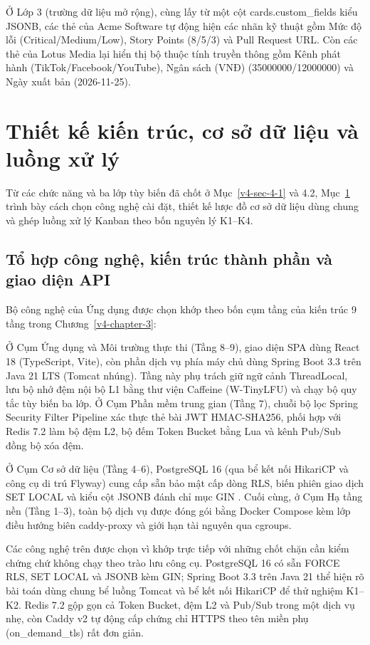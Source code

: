 Ở Lớp 3 (trường dữ liệu mở rộng), cùng lấy từ một cột cards.custom\_\allowbreak{}fields kiểu JSONB, các thẻ của Acme Software tự động hiện các nhãn kỹ thuật gồm Mức độ lỗi (Critical/Medium/Low), Story Points (8/5/3) và Pull Request URL. Còn các thẻ của Lotus Media lại hiển thị bộ thuộc tính truyền thông gồm Kênh phát hành (TikTok/Facebook/YouTube), Ngân sách (VNĐ) (35000000/12000000) và Ngày xuất bản (2026-11-25).

\section{Thiết kế kiến trúc, cơ sở dữ liệu và luồng xử lý}\label{v4-sec-4-3}

Từ các chức năng và ba lớp tùy biến đã chốt ở Mục~\ref{v4-sec-4-1} và 4.2, Mục~\ref{v4-sec-4-3} trình bày cách chọn công nghệ cài đặt, thiết kế lược đồ cơ sở dữ liệu dùng chung và ghép luồng xử lý Kanban theo bốn nguyên lý K1--K4.

\subsection{Tổ hợp công nghệ, kiến trúc thành phần và giao diện API}\label{v4-sec-4-3-1}

Bộ công nghệ của Ứng dụng được chọn khớp theo bốn cụm tầng của kiến trúc 9 tầng trong Chương~\ref{v4-chapter-3}:

Ở Cụm Ứng dụng và Môi trường thực thi (Tầng 8--9), giao diện SPA dùng React 18 (TypeScript, Vite), còn phần dịch vụ phía máy chủ dùng Spring Boot 3.3 trên Java 21 LTS (Tomcat nhúng). Tầng này phụ trách giữ ngữ cảnh ThreadLocal, lưu bộ nhớ đệm nội bộ L1 bằng thư viện Caffeine (W-TinyLFU) và chạy bộ quy tắc tùy biến ba lớp. Ở Cụm Phần mềm trung gian (Tầng 7), chuỗi bộ lọc Spring Security Filter Pipeline xác thực thẻ bài JWT HMAC-SHA256, phối hợp với Redis 7.2 làm bộ đệm L2, bộ đếm Token Bucket bằng Lua và kênh Pub/Sub đồng bộ xóa đệm.

Ở Cụm Cơ sở dữ liệu (Tầng 4--6), PostgreSQL 16 (qua bể kết nối HikariCP và công cụ di trú Flyway) cung cấp sẵn bảo mật cấp dòng RLS, biến phiên giao dịch SET LOCAL và kiểu cột JSONB đánh chỉ mục GIN \cite{v4-22}. Cuối cùng, ở Cụm Hạ tầng nền (Tầng 1--3), toàn bộ dịch vụ được đóng gói bằng Docker Compose kèm lớp điều hướng biên caddy-proxy và giới hạn tài nguyên qua cgroups.

Các công nghệ trên được chọn vì khớp trực tiếp với những chốt chặn cần kiểm chứng chứ không chạy theo trào lưu công cụ. PostgreSQL 16 có sẵn FORCE RLS, SET LOCAL và JSONB kèm GIN; Spring Boot 3.3 trên Java 21 thể hiện rõ bài toán dùng chung bể luồng Tomcat và bể kết nối HikariCP để thử nghiệm K1--K2. Redis 7.2 gộp gọn cả Token Bucket, đệm L2 và Pub/Sub trong một dịch vụ nhẹ, còn Caddy v2 tự động cấp chứng chỉ HTTPS theo tên miền phụ (on\_\allowbreak{}demand\_\allowbreak{}tls) rất đơn giản.

